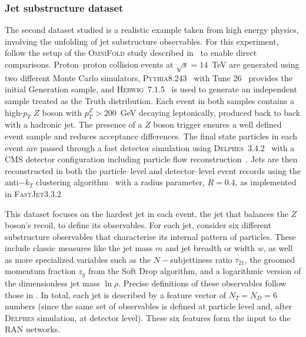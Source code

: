 {{        \subsubsection{Jet substructure dataset}
            The second dataset studied is a realistic example taken from high energy physics, involving the unfolding of jet substructure observables.
            For this experiment, follow the setup of the \textsc{OmniFold} study described in~\cite{andreassen_omnifold_2020} to enable direct comparisons.
            Proton--proton collision events at $\sqrt{s}=14$~TeV are generated using two different Monte Carlo simulators, \textsc{Pythia}8.243~\cite{Sjostrand:2014zea, Sjostrand:2007gs} with Tune 26~\cite{TheATLAScollaboration:2014rfk} provides the initial Generation sample, and \textsc{Herwig}~7.1.5~\cite{Bellm2017HerwigNote, Bahr:2008pv} is used to generate an independent sample treated as the Truth distribution.
            Each event in both samples contains a high-$p_T$ $Z$ boson with $p_T^Z > 200$~GeV decaying leptonically, produced back to back with a hadronic jet.
            The presence of a $Z$ boson trigger ensures a well defined event sample and reduces acceptance differences.
            The final state particles in each event are passed through a fast detector simulation using \textsc{Delphes}~3.4.2~\cite{DeFavereau2014DELPHESExperiment} with a CMS detector configuration including particle flow reconstruction~\cite{Mertens:2015kba, CMS:2017yfk}.
            Jets are then reconstructed in both the particle--level and detector--level event records using the anti$-k_T$ clustering algorithm~\cite{Cacciari:2008gp} with a radius parameter, $R=0.4$, as implemented in \textsc{FastJet}3.3.2~\cite{Cacciari2012FastJetManual}
            
            This dataset focuses on the hardest jet in each event, the jet that balances the $Z$ boson’s recoil, to define its observables.
            For each jet, consider six different substructure observables that characterise its internal pattern of particles.
            These include classic measures like the jet mass $m$ and jet breadth or width $w$, as well as more specialized variables such as the \(N-\)subjettiness ratio $\tau_{21}$, the groomed momentum fraction $z_g$ from the Soft Drop algorithm, and a logarithmic version of the dimensionless jet mass $\ln\rho$.
            Precise definitions of these observables follow those in \cite{andreassen_omnifold_2020}.
            In total, each jet is described by a feature vector of $N_T = N_D = 6$ numbers (since the same set of observables is defined at particle level and, after \textsc{Delphes} simulation, at detector level).
            These six features form the input to the RAN networks.
            
}}
